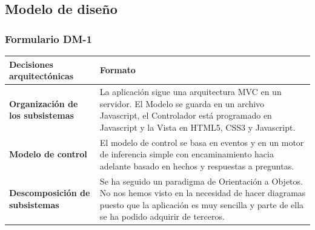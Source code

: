 \documentclass[a4paper,11pt]{article}
\begin{document}
		\subsection{Modelo de diseño}
			\subsubsection{Formulario DM-1}
			\begin{center}
				\begin{tabular}{| l | p{5cm} |}
					\hline
					\textbf{Decisiones arquitectónicas} & \textbf{Formato} \\
					\hline
					\textbf{Organización de los subsistemas} & La aplicación sigue una arquitectura MVC en un servidor. El Modelo se guarda en un archivo Javascript, el Controlador está programado en Javascript y la Vista en HTML5, CSS3 y Javascript.
					\\
					\hline
					\textbf{Modelo de control} & El modelo de control se basa en eventos y en
					un motor de inferencia simple con encaminamiento hacia adelante basado en hechos y respuestas a preguntas.\\
					\hline
					\textbf{Descomposición de subsistemas} & Se ha seguido un paradigma de
					Orientación a Objetos. No nos hemos visto en la necesidad de hacer diagramas puesto que la aplicación es muy sencilla y parte de ella se ha podido adquirir de terceros.\\
					\hline
				\end{tabular}
			\end{center}
			\newpage
\end{document}
